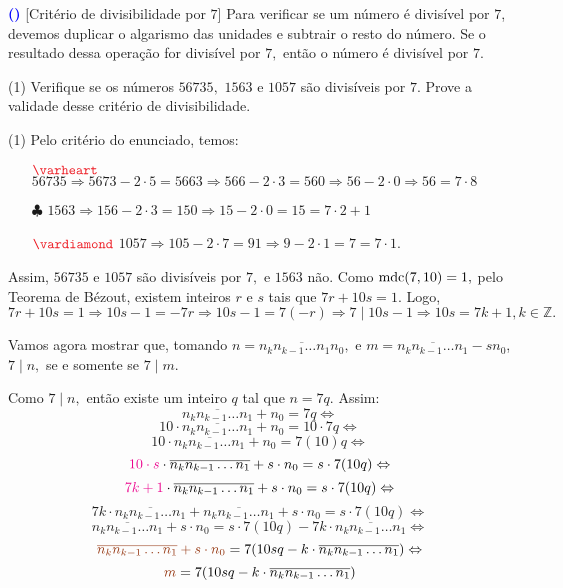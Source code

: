\documentclass[12pt, a4paper]{article}
\newcommand{\mdc}{{\rm mdc}}
\newcommand{\negrito}[1]{\mbox{\boldmath{$#1$}}}
\newcounter{exercicio}[section]
\newenvironment{exercicio}[1][]{\refstepcounter{exercicio}\par\medskip
 \textcolor{blue}{\bf(\theexercicio)} \rmfamily}{\medskip }
\newcommand{\itens}[1]{\begin{tasks}[label={(tsk[a])},label-width=3.6ex, label-format = {\bfseries}, column-sep = {0pt}](1) #1\end{tasks}}
\newcommand{\alt}[1]{\textcolor{Floresta}{$\negrito{(#1)} $}}
\begin{document}
 \begin{exercicio}
 \textsf{[Critério de divisibilidade por $7$]} Para verificar se um número é divisível por $7$, devemos duplicar o algarismo das unidades e subtrair o resto do número. Se o resultado dessa operação for divisível por $7,$ então o número é divisível por $7.$
 \itens{
 \task[\alt{a}] Verifique se os números $56735,$ $1563$ e $1057$ são divisíveis por $7$.
\task[\alt{b}] Prove a validade desse critério de divisibilidade.
}
 \end{exercicio}
 \begin{solution}
 \itens{
 \task[\alt{a}] Pelo critério do enunciado, temos:
 \begin{itemize}
     \item[$\textcolor{Red}{\varheart}$] $56735 \Rightarrow 5673-2 \cdot 5 = 5663 \Rightarrow 566 - 2 \cdot 3 = 560 \Rightarrow 56 - 2 \cdot 0 \Rightarrow 56 = 7 \cdot 8$
     \item[$\clubsuit$] $1563 \Rightarrow 156 - 2 \cdot 3 = 150 \Rightarrow 15 - 2 \cdot 0 = 15 = 7 \cdot 2 + 1$
     \item[$\textcolor{Red}{\vardiamond}$] $1057 \Rightarrow 105-2 \cdot 7 = 91 \Rightarrow 9 - 2 \cdot 1 = 7 = 7 \cdot 1.$
 \end{itemize}
 Assim, $56735$ e $1057$ são divisíveis por $7,$ e $1563$ não.
 \task[\alt{b}] %
 Como $\mdc(7,10) = 1,$ pelo Teorema de Bézout, existem inteiros $r$ e $s$ tais que $7r + 10s = 1.$ Logo,
 \[
 7r + 10s = 1 \Rightarrow 10s - 1 = - 7r \Rightarrow 10s - 1 = 7(-r) \Rightarrow 7 \mid 10s - 1 \Rightarrow 10s = 7k + 1, k \in \mathbb{Z}.
 \]
 
 Vamos agora mostrar que, tomando $n = \overline{n_kn_{k-1} \ldots n_1n_0},$ e $m = \overline{n_kn_{k-1} \ldots n_1} - s n_0$, $7 \mid n,$ se e somente se $7 \mid m.$
 
 Como $7 \mid n,$ então existe um inteiro $q$ tal que $n = 7q.$ Assim:
 \[ \overline{n_kn_{k-1} \ldots n_1} + n_0 = 7q\Leftrightarrow \]
\[ 10 \cdot \overline{n_kn_{k-1} \ldots n_1} + n_0 = 10 \cdot 7q \Leftrightarrow\]
\[ 10 \cdot \overline{n_kn_{k-1} \ldots n_1} + n_0 =  7(10)q \Leftrightarrow\]
\[ \textcolor{Magenta}{10 \cdot s} \cdot \overline{n_kn_{k-1} \ldots n_1} + s \cdot n_0 = s \cdot 7(10q) \Leftrightarrow\]
\[ \textcolor{Magenta}{7k+1} \cdot \overline{n_kn_{k-1} \ldots n_1} + s \cdot n_0 = s \cdot 7(10q)  \Leftrightarrow \]
\[7k \cdot \overline{n_kn_{k-1} \ldots n_1} + \overline{n_kn_{k-1} \ldots n_1} + s \cdot n_0 = s \cdot 7(10q)  \Leftrightarrow \]
\[ \overline{n_kn_{k-1} \ldots n_1} + s \cdot n_0 = s \cdot 7(10q) - 7k \cdot \overline{n_kn_{k-1} \ldots n_1}  \Leftrightarrow \]
\[ \textcolor{RawSienna}{\overline{n_kn_{k-1} \ldots n_1} + s \cdot n_0} =  7(10sq - k \cdot \overline{n_kn_{k-1} \ldots n_1} )\Leftrightarrow \]
\[ \textcolor{RawSienna}{m} = 7(10sq - k \cdot \overline{n_kn_{k-1} \ldots n_1} )\]

}
\end{solution}
\end{document}
